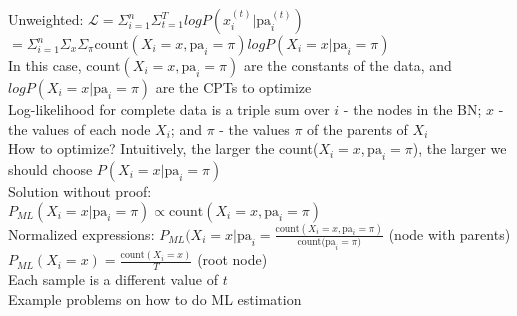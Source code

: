 \documentclass[10pt,letterpaper,unboxed,cm]{article}
\begin{document}
Unweighted: $\mathcal{L} = \Sigma^n_{i=1} \Sigma^T_{t=1} log P(x_i^{(t)}|\text{pa}_i^{(t)})$\\
$ = \Sigma^n_{i=1} \Sigma_x \Sigma_{\pi} \text{count}(X_i = x, \text{pa}_i = \pi) log P(X_i = x|\text{pa}_i = \pi)$\\
In this case, $\text{count}(X_i = x, \text{pa}_i = \pi)$ are the constants of the data, and $log P(X_i = x|\text{pa}_i = \pi)$ are the CPTs to optimize\\
Log-likelihood for complete data is a triple sum over $i$ - the nodes in the BN; $x$ - the values of each node $X_i$; and $\pi$ - the values $\pi$ of the parents of $X_i$\\
How to optimize? Intuitively, the larger the count($X_i = x, \text{pa}_i = \pi$), the larger we should choose $P(X_i = x|\text{pa}_i = \pi)$\\
Solution without proof: \\
$P_{ML} (X_i = x|\text{pa}_i = \pi) \propto \text{count}(X_i = x, \text{pa}_i = \pi)$\\
Normalized expressions: $P_{ML} (X_i = x|\text{pa}_i = \frac{\text{count}(X_i = x, \text{pa}_i = \pi)}{\text{count(pa}_i = \pi)}$ (node with parents)\\
$P_{ML} (X_i = x) = \frac{\text{count}(X_i = x)}{T}$ (root node)\\
Each sample is a different value of $t$\\
Example problems on how to do ML estimation\\
\end{document}
